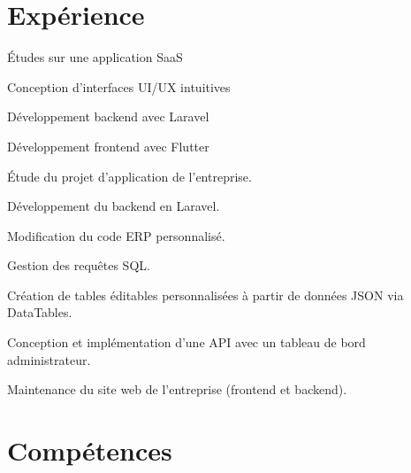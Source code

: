 \documentclass[]{deedy-resume-openfont}
\begin{document}
%
%

\section{Expérience}
\descript{}\hfill {}
\begin{tightemize}
	\item Études sur une application SaaS
	\item Conception d’interfaces UI/UX intuitives
	\item Développement backend avec Laravel
	\item Développement frontend avec Flutter
\end{tightemize} 
\sectionsep

\hfill {}
\begin{tightemize}
	\item Étude du projet d'application de l'entreprise.
	\item Développement du backend en Laravel.
\end{tightemize} 
\sectionsep

\hfill {}
\begin{tightemize}
	 \item Modification du code ERP personnalisé.
	 \item Gestion des requêtes SQL.
	 \item Création de tables éditables personnalisées à partir de données JSON via DataTables.
\end{tightemize} 
\sectionsep

\hfill {}
\begin{tightemize}
	\item Conception et implémentation d'une API avec un tableau de bord administrateur.
	\item Maintenance du site web de l'entreprise (frontend et backend).
\end{tightemize}
\sectionsep

%
%
\section{Compétences}
\end{document}

